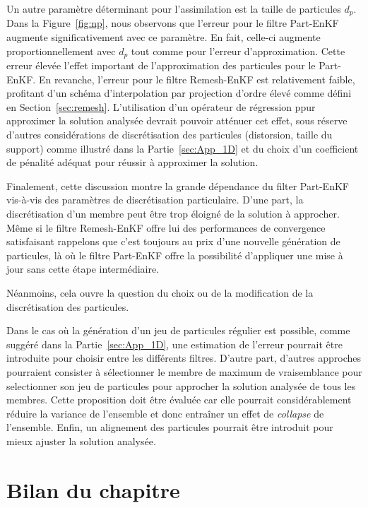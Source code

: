 Un autre paramètre déterminant pour l'assimilation est la taille de particules $d_p$. Dans la Figure~\ref{fig:np}, nous observons que l'erreur pour le filtre Part-EnKF augmente significativement avec ce paramètre. En fait, celle-ci augmente proportionnellement avec $d_p$ tout comme pour l'erreur d'approximation. Cette erreur élevée l'effet important de l'approximation des particules pour le Part-EnKF. En revanche, l'erreur pour le filtre Remesh-EnKF est relativement faible, profitant d'un schéma d'interpolation par projection d'ordre élevé comme défini en Section~\ref{sec:remesh}. L'utilisation d'un opérateur de régression ppur approximer la solution analysée devrait pouvoir atténuer cet effet, sous réserve d'autres considérations de discrétisation des particules (distorsion, taille du support) comme illustré dans la Partie~\ref{sec:App_1D} et du choix d'un coefficient de pénalité adéquat pour réussir à approximer la solution.

Finalement, cette discussion montre la grande dépendance du filter Part-EnKF vis-à-vis des paramètres de discrétisation particulaire. D'une part, la discrétisation d'un membre peut être trop éloigné de la solution à approcher.
Même si le filtre Remesh-EnKF offre lui des performances de convergence satisfaisant rappelons que c'est toujours au prix d'une nouvelle génération de particules, là où le filtre Part-EnKF offre la possibilité d'appliquer une mise à jour sans cette étape intermédiaire.

Néanmoins, cela ouvre la question du choix ou de la modification de la discrétisation des particules.

Dans le cas où la génération d'un jeu de particules régulier est possible, comme suggéré dans la Partie~\ref{sec:App_1D}, une estimation de l'erreur pourrait être introduite pour choisir entre les différents filtres. D'autre part, d'autres approches pourraient consister à sélectionner le membre de maximum de vraisemblance pour selectionner son jeu de particules pour approcher la solution analysée de tous les membres. Cette proposition doit être évaluée car elle pourrait considérablement réduire la variance de l'ensemble et donc entraîner un effet de \textit{collapse} de l'ensemble. Enfin, un alignement des particules pourrait être introduit pour mieux ajuster la solution analysée.

\section{Bilan du chapitre}

